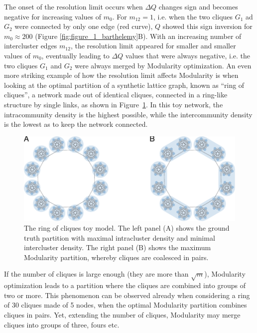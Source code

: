 The onset of the resolution limit occurs when $\Delta Q$ changes sign and becomes negative for increasing values of $m_0$.
For $m_{12}=1$, i.e. when the two cliques $G_1$ ad $G_2$ were connected by only one edge (red curve), $Q$ showed this sign inversion for $m_0 \approx 200$ (Figure \ref{fig:figure_1_barthelemy}B).
With an increasing number of intercluster edges $m_{12}$, the resolution limit appeared for smaller and smaller values of $m_0$, eventually leading to $\Delta Q$ values that were always negative, i.e. the two cliques $G_1$ and $G_2$ were always merged by Modularity optimization.
An even more striking example of how the resolution limit affects Modularity is when looking at the optimal partition of a synthetic lattice graph, known as ``ring of cliques'', a network made out of identical cliques, connected in a ring-like structure by single links, as shown in Figure~\ref{fig:traag_ring_of_cliques}. In this toy network, the intracommunity density is the highest possible, while the intercommunity density is the lowest as to keep the network connected.
\begin{figure}[htb!]
\centering
\includegraphics[width=1\textwidth]{images/traag_ring_of_cliques.pdf}
\caption{The ring of cliques toy model. The left panel (A) shows the ground truth partition with maximal intracluster density and minimal intercluster density. The right panel (B) shows the maximum Modularity partition, whereby cliques are coalesced in pairs.}
\label{fig:traag_ring_of_cliques}
\end{figure}
If the number of cliques is large enough (they are more than $\sqrt{m}$), Modularity optimization leads to a partition where the cliques are combined into groups of two or more. This phenomenon can be observed already when considering a ring of 30 cliques made of 5 nodes, when the optimal Modularity partition combines cliques in pairs.
Yet, extending the number of cliques, Modularity may merge cliques into groups of three, fours etc.


